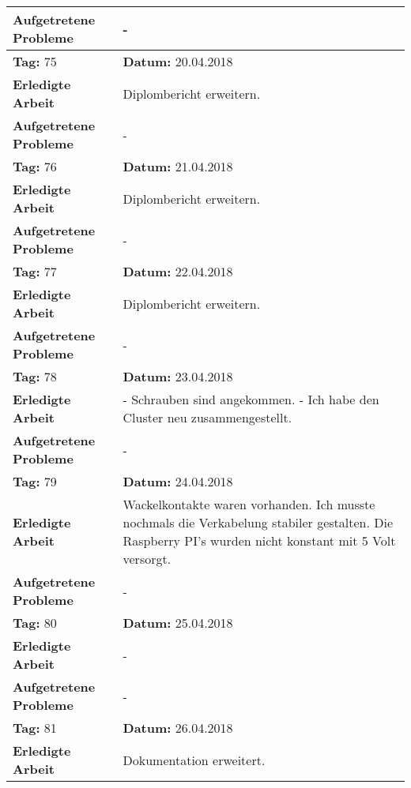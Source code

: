 \begin{longtable}{|p{5cm}|p{5cm}p{6cm}|}
\textbf{Aufgetretene Probleme} & \multicolumn{2}{p{11cm}|}{-} \\ \hline
\rowcolor{heading}\textbf{Tag:} 75 & \textbf{Datum:} 20.04.2018 & \\ \hline
\textbf{Erledigte Arbeit} & \multicolumn{2}{p{11cm}|}{Diplombericht erweitern.} \\ \hline
\textbf{Aufgetretene Probleme} & \multicolumn{2}{p{11cm}|}{-} \\ \hline
\rowcolor{heading}\textbf{Tag:} 76 & \textbf{Datum:} 21.04.2018 & \\ \hline
\textbf{Erledigte Arbeit} & \multicolumn{2}{p{11cm}|}{Diplombericht erweitern.} \\ \hline
\textbf{Aufgetretene Probleme} & \multicolumn{2}{p{11cm}|}{-} \\ \hline
\rowcolor{heading}\textbf{Tag:} 77 & \textbf{Datum:} 22.04.2018 & \\ \hline
\textbf{Erledigte Arbeit} & \multicolumn{2}{p{11cm}|}{Diplombericht erweitern.} \\ \hline
\textbf{Aufgetretene Probleme} & \multicolumn{2}{p{11cm}|}{-} \\ \hline
\rowcolor{heading}\textbf{Tag:} 78 & \textbf{Datum:} 23.04.2018 & \\ \hline
\textbf{Erledigte Arbeit} & \multicolumn{2}{p{11cm}|}{- Schrauben sind angekommen.\newline
- Ich habe den Cluster neu zusammengestellt.} \\ \hline
\textbf{Aufgetretene Probleme} & \multicolumn{2}{p{11cm}|}{-} \\ \hline
\rowcolor{heading}\textbf{Tag:} 79 & \textbf{Datum:} 24.04.2018 & \\ \hline
\textbf{Erledigte Arbeit} & \multicolumn{2}{p{11cm}|}{Wackelkontakte waren vorhanden. Ich musste nochmals die Verkabelung stabiler gestalten. Die Raspberry PI's wurden nicht konstant mit 5 Volt versorgt.} \\ \hline
\textbf{Aufgetretene Probleme} & \multicolumn{2}{p{11cm}|}{-} \\ \hline
\rowcolor{heading}\textbf{Tag:} 80 & \textbf{Datum:} 25.04.2018 & \\ \hline
\textbf{Erledigte Arbeit} & \multicolumn{2}{p{11cm}|}{-} \\ \hline
\textbf{Aufgetretene Probleme} & \multicolumn{2}{p{11cm}|}{-} \\ \hline
\rowcolor{heading}\textbf{Tag:} 81 & \textbf{Datum:} 26.04.2018 & \\ \hline
\textbf{Erledigte Arbeit} & \multicolumn{2}{p{11cm}|}{Dokumentation erweitert.} \\ \hline

\end{longtable}
